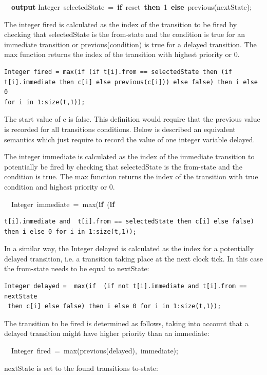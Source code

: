\documentclass[10pt,a4paper]{report}
\begin{document}
~~\textbf{output}
Integer~selectedState~=~\textbf{if}~reset~\textbf{then}~1~\textbf{else}~previous(nextState);

The integer fired is calculated as the index of the transition to be
fired by checking that selectedState is the from-state and the condition
is true for an immediate transition or previous(condition) is true for a
delayed transition. The max function returns the index of the transition
with highest priority or 0.

\begin{lstlisting}[language=modelica]
  Integer fired = max(if (if t[i].from == selectedState then (if t[i].immediate then c[i] else previous(c[i])) else false) then i else 0 
for i in 1:size(t,1));
\end{lstlisting}
The start value of c is false. This definition would require that the
previous value is recorded for all transitions conditions. Below is
described an equivalent semantics which just require to record the value
of one integer variable delayed.

The integer immediate is calculated as the index of the immediate
transition to potentially be fired by checking that selectedState is the
from-state and the condition is true. The max function returns the index
of the transition with true condition and highest priority or 0.

~~Integer~immediate~=~max(\textbf{if}~(\textbf{if}~
\begin{lstlisting}[language=modelica]
  t[i].immediate and  t[i].from == selectedState then c[i] else false) then i else 0 for i in 1:size(t,1));
\end{lstlisting}
In a similar way, the Integer delayed is calculated as the index for a
potentially delayed transition, i.e. a transition taking place at the
next clock tick. In this case the from-state needs to be equal to
nextState:

\begin{lstlisting}[language=modelica]
  Integer delayed =  max(if  (if not t[i].immediate and t[i].from == nextState
 then c[i] else false) then i else 0 for i in 1:size(t,1));
\end{lstlisting}
The transition to be fired is determined as follows, taking into account
that a delayed transition might have higher priority than an immediate:

~~Integer~fired~=~max(previous(delayed),~immediate);

nextState is set to the found transitions to-state:
\end{document}
